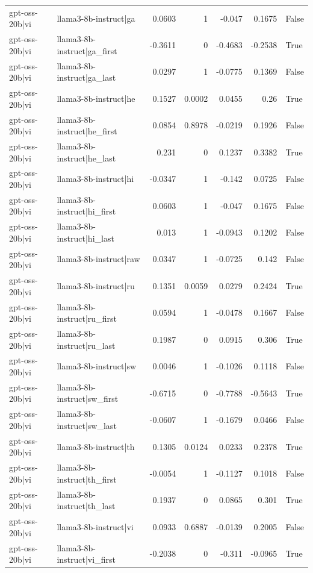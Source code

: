 \begin{table}
\begin{tabular}{l l r r r r l}
gpt-oss-20b|vi & llama3-8b-instruct|ga & 0.0603 & 1 & -0.047 & 0.1675 & False \\
gpt-oss-20b|vi & llama3-8b-instruct|ga_first & -0.3611 & 0 & -0.4683 & -0.2538 & True \\
gpt-oss-20b|vi & llama3-8b-instruct|ga_last & 0.0297 & 1 & -0.0775 & 0.1369 & False \\
gpt-oss-20b|vi & llama3-8b-instruct|he & 0.1527 & 0.0002 & 0.0455 & 0.26 & True \\
gpt-oss-20b|vi & llama3-8b-instruct|he_first & 0.0854 & 0.8978 & -0.0219 & 0.1926 & False \\
gpt-oss-20b|vi & llama3-8b-instruct|he_last & 0.231 & 0 & 0.1237 & 0.3382 & True \\
gpt-oss-20b|vi & llama3-8b-instruct|hi & -0.0347 & 1 & -0.142 & 0.0725 & False \\
gpt-oss-20b|vi & llama3-8b-instruct|hi_first & 0.0603 & 1 & -0.047 & 0.1675 & False \\
gpt-oss-20b|vi & llama3-8b-instruct|hi_last & 0.013 & 1 & -0.0943 & 0.1202 & False \\
gpt-oss-20b|vi & llama3-8b-instruct|raw & 0.0347 & 1 & -0.0725 & 0.142 & False \\
gpt-oss-20b|vi & llama3-8b-instruct|ru & 0.1351 & 0.0059 & 0.0279 & 0.2424 & True \\
gpt-oss-20b|vi & llama3-8b-instruct|ru_first & 0.0594 & 1 & -0.0478 & 0.1667 & False \\
gpt-oss-20b|vi & llama3-8b-instruct|ru_last & 0.1987 & 0 & 0.0915 & 0.306 & True \\
gpt-oss-20b|vi & llama3-8b-instruct|sw & 0.0046 & 1 & -0.1026 & 0.1118 & False \\
gpt-oss-20b|vi & llama3-8b-instruct|sw_first & -0.6715 & 0 & -0.7788 & -0.5643 & True \\
gpt-oss-20b|vi & llama3-8b-instruct|sw_last & -0.0607 & 1 & -0.1679 & 0.0466 & False \\
gpt-oss-20b|vi & llama3-8b-instruct|th & 0.1305 & 0.0124 & 0.0233 & 0.2378 & True \\
gpt-oss-20b|vi & llama3-8b-instruct|th_first & -0.0054 & 1 & -0.1127 & 0.1018 & False \\
gpt-oss-20b|vi & llama3-8b-instruct|th_last & 0.1937 & 0 & 0.0865 & 0.301 & True \\
gpt-oss-20b|vi & llama3-8b-instruct|vi & 0.0933 & 0.6887 & -0.0139 & 0.2005 & False \\
gpt-oss-20b|vi & llama3-8b-instruct|vi_first & -0.2038 & 0 & -0.311 & -0.0965 & True \\

\end{tabular}
\end{table}
